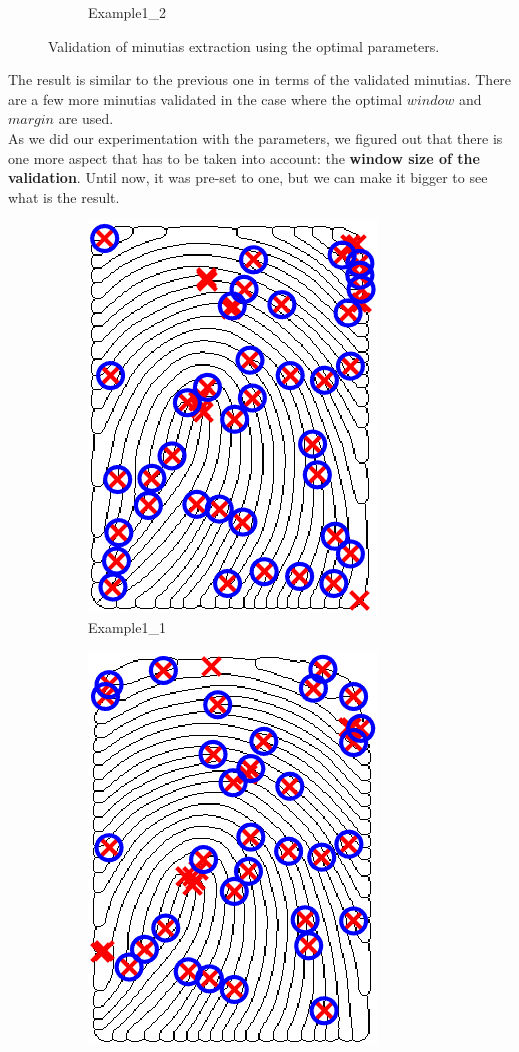 \documentclass[a4paper]{article}
\begin{document}
\begin{figure}[H]
\begin{subfigure}[t]{0.45\textwidth}
         \caption{Example1\_2}
     \end{subfigure}
    \caption{Validation of minutias extraction using the optimal parameters.}
    \label{fig:ex6b}
\end{figure}

The result is similar to the previous one in terms of the validated minutias. There are a few more minutias validated in the case where the optimal \(window\) and \(margin\) are used.\\

As we did our experimentation with the parameters, we figured out that there is one more aspect that has to be taken into account: the \textbf{window size of the validation}. Until now, it was pre-set to one, but we can make it bigger to see what is the result.

\begin{figure}[H]
  \centering
       \begin{subfigure}[t]{0.45\textwidth}
         \centering
         \includegraphics[scale=0.7]{Figures/Validation1-valwin7}
         \caption{Example1\_1}
     \end{subfigure}%
     \quad
     \begin{subfigure}[t]{0.45\textwidth}
         \centering
         \includegraphics[scale=0.7]{Figures/Validation2-valwin7}

\end{subfigure}
\end{figure}
\end{document}
